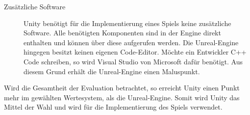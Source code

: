 \begin{description}
		\item[Zusätzliche Software]{Unity benötigt für die Implementierung eines Spiels keine zusätzliche Software. Alle benötigten Komponenten sind in der Engine direkt enthalten und können über diese aufgerufen werden. Die Unreal-Engine hingegen besitzt keinen eigenen Code-Editor. Möchte ein Entwickler C++ Code schreiben, so wird Visual Studio von Microsoft dafür benötigt. Aus diesem Grund erhält die Unreal-Engine einen Maluspunkt.}
	\end{description}
	Wird die Gesamtheit der Evaluation betrachtet, so erreicht Unity einen Punkt mehr im gewählten Wertesystem, als die Unreal-Engine. Somit wird Unity das Mittel der Wahl und wird für die Implementierung des Spiels verwendet.
